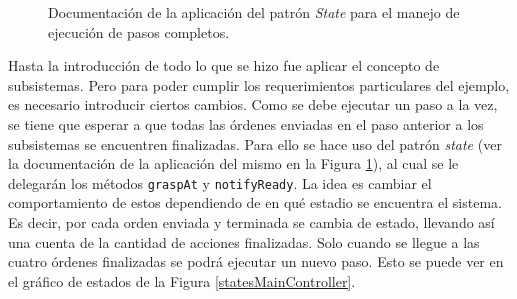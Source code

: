 \begin{figure}[H]
\caption{Documentación de la aplicación del patrón \textit{State} para el manejo de ejecución de pasos completos.}
\label{docEstateMain}
\end{figure}
\FloatBarrier


Hasta la introducción de \MainController todo lo que se hizo fue aplicar el concepto de subsistemas. Pero para poder cumplir los requerimientos particulares del ejemplo, es necesario introducir ciertos cambios. Como se debe ejecutar un paso a la vez, se tiene que esperar a que todas las órdenes enviadas en el paso anterior a los subsistemas se encuentren finalizadas. Para ello se hace uso del patrón \textit{state} (ver la documentación de la aplicación del mismo en la Figura \ref{docEstateMain}), al cual se le delegarán los métodos \verb|graspAt| y \verb|notifyReady|. La idea es cambiar el comportamiento de estos dependiendo de en qué estadio se encuentra el sistema. Es decir, por cada orden enviada y terminada se cambia de estado, llevando así una cuenta de la cantidad de acciones finalizadas. Solo cuando se llegue a las cuatro órdenes finalizadas se podrá ejecutar un nuevo paso. Esto se puede ver en el gráfico de estados de la Figura \ref{statesMainController}.

